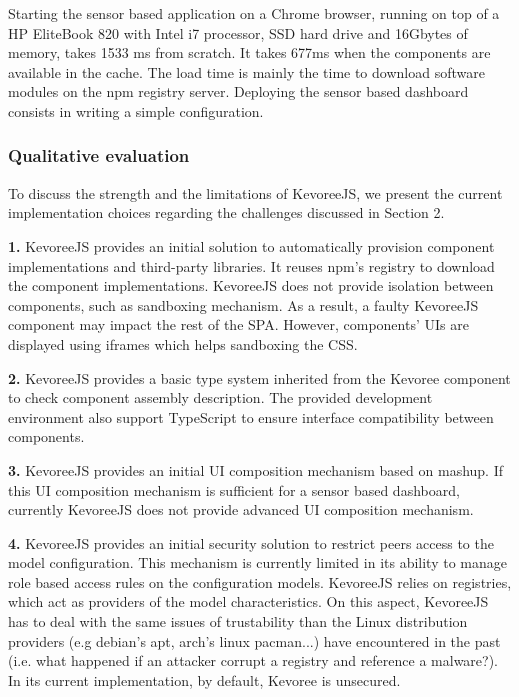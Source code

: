 Starting the sensor based application on a Chrome browser, running on top of a HP EliteBook 820 with Intel i7 processor, SSD hard drive and 16Gbytes of memory, takes 1533 ms from scratch. It takes 677ms when the components are available in the cache. The load time is mainly the time to download software modules on the npm registry server. Deploying the sensor based dashboard consists in writing a simple configuration.


\subsubsection{Qualitative evaluation  }
To discuss the strength and the limitations of KevoreeJS, we present the current implementation choices regarding the challenges discussed in Section 2.

\indent \textbf{1.} KevoreeJS provides an initial solution to automatically provision component implementations and third-party libraries. It reuses npm's registry to download the component implementations. KevoreeJS does not provide isolation between components, such as sandboxing mechanism. As a result, a faulty KevoreeJS component may impact the rest of the SPA. However, components' UIs are displayed using iframes which helps sandboxing the CSS.

\indent \textbf{2.} KevoreeJS provides a basic type system inherited from the Kevoree component to check component assembly description. The provided development environment also support TypeScript to ensure interface compatibility between components.

\indent \textbf{3.} KevoreeJS provides an initial UI composition mechanism based on mashup. If this UI composition mechanism is sufficient for a sensor based dashboard, currently KevoreeJS does not provide advanced UI composition mechanism.

\indent \textbf{4.} KevoreeJS provides an initial security solution to restrict peers access to the model configuration. This mechanism is currently limited in its ability to manage role based access rules on the configuration models. KevoreeJS relies on registries, which act as providers of the model characteristics. On this aspect, KevoreeJS has to deal with the same issues of trustability than the Linux distribution providers (e.g debian's apt, arch's linux pacman...) have encountered in the past (i.e. what happened if an attacker corrupt a registry and reference a malware?).  In its current implementation, by default, Kevoree is unsecured.

